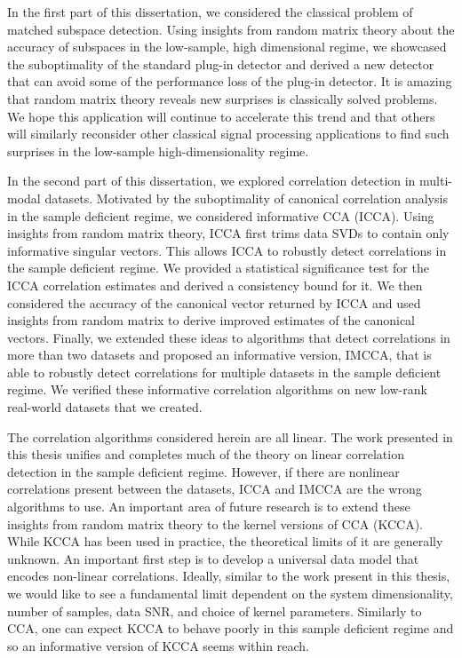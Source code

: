 In the first part of this dissertation, we considered the classical problem of matched
subspace detection. Using insights from random matrix theory about the accuracy of
subspaces in the low-sample, high dimensional regime, we showcased the suboptimality of
the standard plug-in detector and derived a new detector that can avoid some of the
performance loss of the plug-in detector. It is amazing that random matrix theory reveals
new surprises is classically solved problems. We hope this application will continue to
accelerate this trend and that others will similarly reconsider other classical signal
processing applications to find such surprises in the low-sample high-dimensionality
regime.

In the second part of this dissertation, we explored correlation detection in multi-modal
datasets. Motivated by the suboptimality of canonical correlation analysis in the sample
deficient regime, we considered informative CCA (ICCA). Using insights from random matrix
theory, ICCA first trims data SVDs to contain only informative singular vectors. This
allows ICCA to robustly detect correlations in the sample deficient regime. We provided a
statistical significance test for the ICCA correlation estimates and derived a consistency
bound for it. We then considered the accuracy of the canonical vector returned by ICCA and
used insights from random matrix to derive improved estimates of the canonical
vectors. Finally, we extended these ideas to algorithms that detect correlations in more
than two datasets and proposed an informative version, IMCCA, that is able to robustly
detect correlations for multiple datasets in the sample deficient regime. We verified
these informative correlation algorithms on new low-rank real-world datasets that we
created.


The correlation algorithms considered herein are all linear. The work presented in this
thesis unifies and completes much of the theory on linear correlation detection in the
sample deficient regime. However, if there are nonlinear correlations present between the
datasets, ICCA and IMCCA are the wrong algorithms to use. An important area of future
research is to extend these insights from random matrix theory to the kernel versions of
CCA (KCCA). While KCCA has been used in practice, the theoretical limits of it are
generally unknown. An important first step is to develop a universal data model that
encodes non-linear correlations. Ideally, similar to the work present in this thesis, we
would like to see a fundamental limit dependent on the system dimensionality, number of
samples, data SNR, and choice of kernel parameters. Similarly to CCA, one can expect KCCA
to behave poorly in this sample deficient regime and so an informative version of KCCA
seems within reach.


